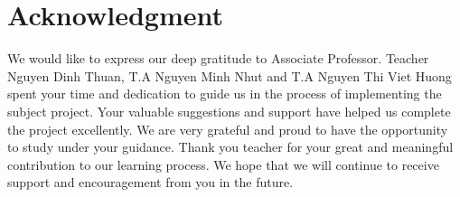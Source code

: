 \documentclass{ieeeojies}
\begin{document}
\section*{Acknowledgment}
We would like to express our deep gratitude to Associate Professor. Teacher Nguyen Dinh Thuan, T.A Nguyen Minh Nhut and T.A Nguyen Thi Viet Huong spent your time and dedication to guide us in the process of implementing the subject project. Your valuable suggestions and support have helped us complete the project excellently. We are very grateful and proud to have the opportunity to study under your guidance. Thank you teacher for your great and meaningful contribution to our learning process. We hope that we will continue to receive support and encouragement from you in the future.


\end{document}
